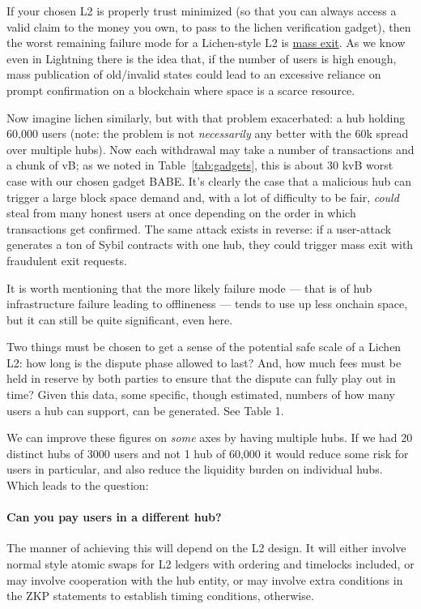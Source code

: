 \documentclass[11pt]{article}
\begin{document}
If your chosen L2 is properly trust minimized (so that you can always access a valid claim to the money you own, to pass to the lichen verification gadget), then the worst remaining failure mode for a Lichen-style L2 is \underline{mass exit}. As we know even in Lightning there is the idea that, if the number of users is high enough, mass publication of old/invalid states could lead to an excessive reliance on prompt confirmation on a blockchain where space is a scarce resource.

Now imagine lichen similarly, but with that problem exacerbated: a hub holding 60,000 users (note: the problem is not \emph{necessarily} any better with the 60k spread over multiple hubs). Now each withdrawal may take a number of transactions and a chunk of vB; as we noted in Table~\ref{tab:gadgets}, this is about 30 kvB worst case with our chosen gadget BABE. It's clearly the case that a malicious hub can trigger a large block space demand and, with a lot of difficulty to be fair, \emph{could} steal from many honest users at once depending on the order in which transactions get confirmed. The same attack exists in reverse: if a user-attack generates a ton of Sybil contracts with one hub, they could trigger mass exit with fraudulent exit requests.

It is worth mentioning that the more likely failure mode --- that is of hub infrastructure failure leading to offlineness --- tends to use up less onchain space, but it can still be quite significant, even here.

Two things must be chosen to get a sense of the potential safe scale of a Lichen L2: how long is the dispute phase allowed to last? And, how much fees must be held in reserve by both parties to ensure that the dispute can fully play out in time? Given this data, some specific, though estimated, numbers of how many users a hub can support, can be generated. See Table 1.

We can improve these figures on \emph{some} axes by having multiple hubs. If we had 20 distinct hubs of 3000 users and not 1 hub of 60,000 it would reduce some risk for users in particular, and also reduce the liquidity burden on individual hubs. Which leads to the question:

\paragraph{Can you pay users in a different hub?} The manner of achieving this will depend on the L2 design. It will either involve normal style atomic swaps for L2 ledgers with ordering and timelocks included, or may involve cooperation with the hub entity, or may involve extra conditions in the ZKP statements to establish timing conditions, otherwise.
\end{document}
